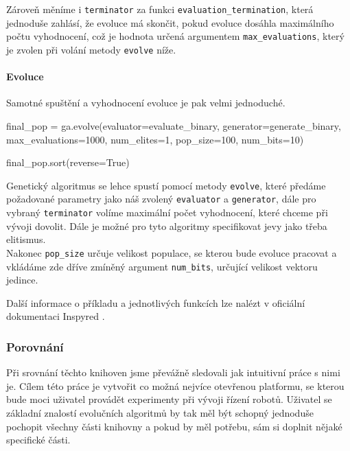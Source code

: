 Zároveň měníme i \texttt{terminator} za funkci \texttt{evaluation\_termination},
která jednoduše zahlásí, že evoluce má skončit, pokud evoluce dosáhla
maximálního počtu vyhodnocení, což je hodnota určená argumentem
\texttt{max\_evaluations}, který je zvolen při volání metody \texttt{evolve}
níže.

\paragraph{Evoluce}
Samotné spuštění a vyhodnocení evoluce je pak velmi jednoduché.

\begin{code}
final_pop = ga.evolve(evaluator=evaluate_binary,
                      generator=generate_binary,
                      max_evaluations=1000,
                      num_elites=1,
                      pop_size=100,
                      num_bits=10)

final_pop.sort(reverse=True)
\end{code}

Genetický algoritmus se lehce spustí pomocí metody \texttt{evolve}, které předáme
požadované parametry jako náš zvolený \texttt{evaluator} a \texttt{generator},
dále pro vybraný \texttt{terminator} volíme maximální počet vyhodnocení, které
chceme při vývoji dovolit. Dále je možné pro tyto algoritmy specifikovat jevy
jako třeba elitismus. \\Nakonec \texttt{pop\_size} určuje velikost populace, se
kterou bude evoluce pracovat a vkládáme zde dříve zmíněný argument
\texttt{num\_bits}, určující velikost vektoru jedince. 

Další informace o příkladu a jednotlivých funkcích lze nalézt v oficiální
dokumentaci Inspyred \citep{InspyredDocs}.


\subsubsection{Porovnání} \label{GA - Porovnání}
Při srovnání těchto knihoven jsme převážně sledovali jak intuitivní práce s
nimi je. Cílem této práce je vytvořit co možná nejvíce otevřenou platformu, se
kterou bude moci uživatel provádět experimenty při vývoji řízení robotů.
Uživatel se základní znalostí evolučních algoritmů by tak měl být schopný
jednoduše pochopit všechny části knihovny a pokud by měl potřebu, sám si
doplnit nějaké specifické části. 

